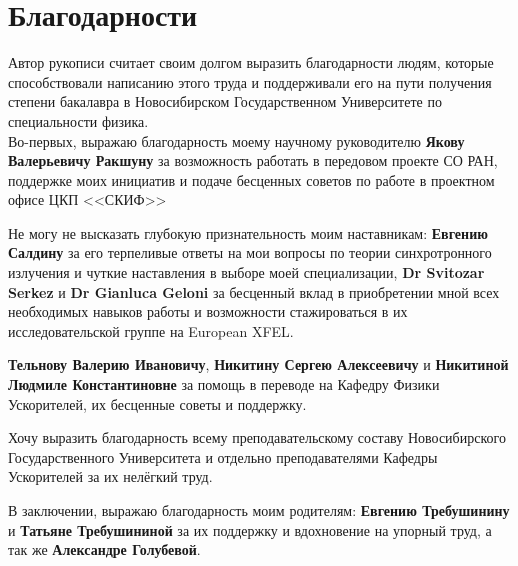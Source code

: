 \chapter*{Благодарности}
Автор рукописи считает своим долгом выразить благодарности людям, которые способствовали написанию этого труда и поддерживали его на пути получения степени бакалавра в Новосибирском Государственном Университете по специальности физика.\\

Во-первых, выражаю благодарность моему научному руководителю \textbf{Якову Валерьевичу Ракшуну} за возможность работать в передовом проекте СО РАН, поддержке моих инициатив и подаче бесценных советов по работе в проектном офисе ЦКП <<СКИФ>>

Не могу не высказать глубокую признательность моим наставникам: \textbf{Евгению Салдину} за его терпеливые ответы на мои вопросы по теории синхротронного излучения и чуткие наставления в выборе моей специализации, \textbf{Dr Svitozar Serkez} и \textbf{Dr Gianluca Geloni} за бесценный вклад в приобретении мной всех необходимых навыков работы и возможности стажироваться в их исследовательской группе на European XFEL.

\textbf{Тельнову Валерию Ивановичу}, \textbf{Никитину Сергею Алексеевичу} и \textbf{Никитиной Людмиле Константиновне} за помощь в переводе на Кафедру Физики Ускорителей, их бесценные советы и поддержку.

Хочу выразить благодарность всему преподавательскому составу Новосибирского Государственного Университета и отдельно преподавателями Кафедры Ускорителей за их нелёгкий труд.

В заключении, выражаю благодарность моим родителям: \textbf{Евгению Требушинину} и \textbf{Татьяне Требушининой} за их поддержку и вдохновение на упорный труд, а так же \textbf{Александре Голубевой}.